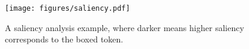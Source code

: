 \begin{figure}
    \centering
    \texttt{[image: figures/saliency.pdf]}
    \caption{A saliency analysis example, where darker means higher saliency corresponds to the boxed token.
} 
\vspace{-0.2in}
    \label{fig:saliency}
\end{figure}


